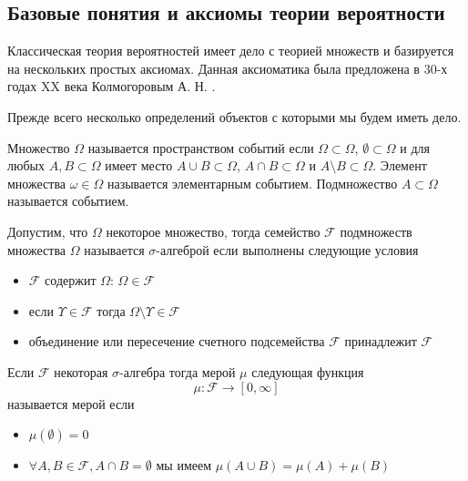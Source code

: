 \subsection{Базовые понятия и аксиомы теории вероятности}

Классическая теория вероятностей имеет дело с теорией множеств и
базируется на нескольких простых аксиомах. Данная аксиоматика была
предложена в 30-х годах XX века Колмогоровым
А. Н. \cite{bKolmogorov74basic}. 

Прежде всего несколько определений объектов с которыми мы будем иметь
дело. 

\begin{definition}
\label{def:events_set}
  Множество $\Omega$ называется пространством событий если
  $\Omega \subset \Omega$, $\emptyset \subset \Omega$ и для любых
  $A,B \subset \Omega$ имеет место
  $A \cup B \subset \Omega$, $A \cap B \subset \Omega$ и
  $A \setminus B \subset \Omega$.  Элемент множества
  $\omega \in \Omega$ называется элементарным событием. Подмножество 
  $A \subset \Omega$ называется событием.
\end{definition}

\begin{definition}
\label{def:sigma_algebra}
Допустим, что $\Omega$ некоторое множество, тогда семейство
$\mathcal{F}$ подмножеств множества $\Omega$ называется
$\sigma$-алгеброй если выполнены следующие условия
\begin{itemize}
\item $\mathcal{F}$ содержит $\Omega$: $\Omega \in \mathcal{F}$
\item если $\Upsilon  \in \mathcal{F}$ тогда $\Omega \setminus \Upsilon
  \in \mathcal{F}$
\item объединение или пересечение счетного подсемейства $\mathcal{F}$
  принадлежит $\mathcal{F}$
\end{itemize}
\end{definition}

\begin{definition}[Мера]
\label{def:measure} 
Если $\mathcal{F}$ некоторая $\sigma$-алгебра тогда мерой $\mu$
следующая функция 
\[
\mu: \mathcal{F} \to \left[0, \infty\right]
\]
называется мерой если 
\begin{itemize}
\item $\mu\left(\emptyset\right) = 0$
\item $\forall A, B \in \mathcal{F}, A \cap B = \emptyset$ мы имеем
$\mu\left(A \cup B\right) = \mu\left(A\right) +
  \mu\left(B\right)$ 
\end{itemize}
\end{definition}

